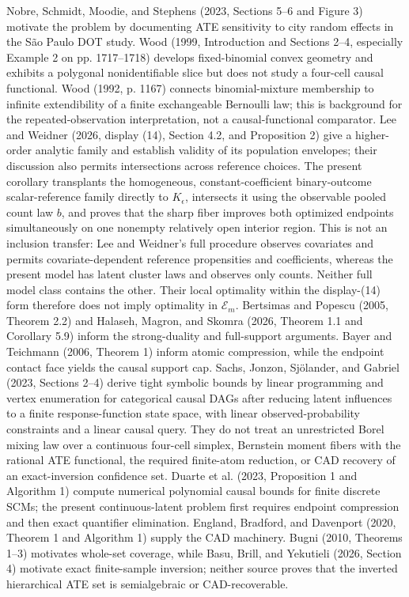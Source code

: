 Nobre, Schmidt, Moodie, and Stephens (2023, Sections 5--6 and Figure 3) motivate the problem by documenting ATE sensitivity to city random effects in the S\~ao Paulo DOT study. Wood (1999, Introduction and Sections 2--4, especially Example 2 on pp. 1717--1718) develops fixed-binomial convex geometry and exhibits a polygonal nonidentifiable slice but does not study a four-cell causal functional. Wood (1992, p. 1167) connects binomial-mixture membership to infinite extendibility of a finite exchangeable Bernoulli law; this is background for the repeated-observation interpretation, not a causal-functional comparator. Lee and Weidner (2026, display (14), Section 4.2, and Proposition 2) give a higher-order analytic family and establish validity of its population envelopes; their discussion also permits intersections across reference choices. The present corollary transplants the homogeneous, constant-coefficient binary-outcome scalar-reference family directly to \(K_{\epsilon}\), intersects it using the observable pooled count law \(b\), and proves that the sharp fiber improves both optimized endpoints simultaneously on one nonempty relatively open interior region. This is not an inclusion transfer: Lee and Weidner's full procedure observes covariates and permits covariate-dependent reference propensities and coefficients, whereas the present model has latent cluster laws and observes only counts. Neither full model class contains the other. Their local optimality within the display-(14) form therefore does not imply optimality in \(\mathcal E_m\). Bertsimas and Popescu (2005, Theorem 2.2) and Halaseh, Magron, and Skomra (2026, Theorem 1.1 and Corollary 5.9) inform the strong-duality and full-support arguments. Bayer and Teichmann (2006, Theorem 1) inform atomic compression, while the endpoint contact face yields the causal support cap. Sachs, Jonzon, Sj\"olander, and Gabriel (2023, Sections 2--4) derive tight symbolic bounds by linear programming and vertex enumeration for categorical causal DAGs after reducing latent influences to a finite response-function state space, with linear observed-probability constraints and a linear causal query. They do not treat an unrestricted Borel mixing law over a continuous four-cell simplex, Bernstein moment fibers with the rational ATE functional, the required finite-atom reduction, or CAD recovery of an exact-inversion confidence set. Duarte et al. (2023, Proposition 1 and Algorithm 1) compute numerical polynomial causal bounds for finite discrete SCMs; the present continuous-latent problem first requires endpoint compression and then exact quantifier elimination. England, Bradford, and Davenport (2020, Theorem 1 and Algorithm 1) supply the CAD machinery. Bugni (2010, Theorems 1--3) motivates whole-set coverage, while Basu, Brill, and Yekutieli (2026, Section 4) motivate exact finite-sample inversion; neither source proves that the inverted hierarchical ATE set is semialgebraic or CAD-recoverable.